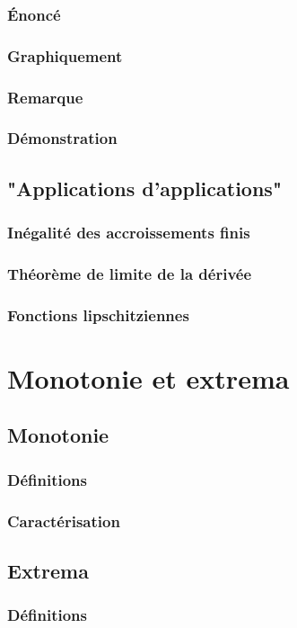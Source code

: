 \documentclass[12pt,a4paper,french]{book}
\begin{document}
			\subsubsection{Énoncé}
			\subsubsection{Graphiquement}
			\subsubsection{Remarque}
			\subsubsection{Démonstration}
		\subsection{"Applications d'applications"}
			\subsubsection{Inégalité des accroissements finis}
			\subsubsection{Théorème de limite de la dérivée}
			\subsubsection{Fonctions lipschitziennes}
	\section{Monotonie et extrema}
		\subsection{Monotonie}
			\subsubsection{Définitions}
			\subsubsection{Caractérisation}
		\subsection{Extrema}
			\subsubsection{Définitions}
\end{document}
